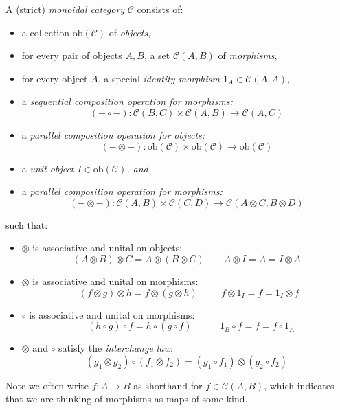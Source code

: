 \documentclass[12pt]{article}
\begin{document}
\begin{definition}\label{def:strict-monoidal}
  A (strict) \textit{monoidal category} $\mathcal C$ consists of: 
  \begin{itemize}
    \item a collection $\textrm{ob}(\mathcal C)$ of \textit{objects},
    \item for every pair of objects $A, B$, a set $\mathcal C(A,B)$ of \textit{morphisms},
    \item for every object $A$, a special \em identity morphism \em $1_A \in \mathcal C(A,A)$,
    \item a \em sequential composition \em operation for morphisms:
    \[ (- \circ -) : \mathcal C(B,C) \times \mathcal C(A,B) \to \mathcal C(A,C) \]
    \item a \em parallel composition \em operation for objects: 
\[  
(- \otimes -) : \textrm{ob}(\mathcal C) \times \textrm{ob}(\mathcal C) \to \textrm{ob}(\mathcal C)
\]
    \item a \em unit object \em $I \in \textrm{ob}(\mathcal C)$, and
    \item a \em parallel composition \em operation for morphisms:
    \[ 
    (- \otimes -) : \mathcal C(A,B) \times \mathcal C(C,D) \to \mathcal C(A\otimes C,B \otimes D) 
    \]  
  \end{itemize}
  such that:
  \begin{itemize}
    \item $\otimes$ is associative and unital on objects:
    \[ (A \otimes B) \otimes C = A \otimes (B \otimes C) \qquad A \otimes I = A = I \otimes A \]
    \item $\otimes$ is associative and unital on morphisms:
    \[ \ \  (f \otimes g) \otimes h = f \otimes (g \otimes h) \ \   \qquad f \otimes 1_I = f = 1_I \otimes f \]
    \item $\circ$ is associative and unital on morphisms:
    \[ \ \ \ \   (h \circ g) \circ f = h \circ (g \circ f) \ \ \ \   \qquad 1_B \circ f = f = f \circ 1_A \]
    \item $\otimes$ and $\circ$ satisfy the \textit{interchange law}:  
    \[ 
    (g_1\otimes g_2)\circ(f_1\otimes f_2) = (g_1\circ f_1)\otimes(g_2\circ f_2)
    \]
  \end{itemize}
\end{definition}

Note we often write $f : A \to B$ as shorthand for $f \in \mathcal C(A, B)$, which indicates that we are thinking of morphisms as maps of some kind.
\end{document}
